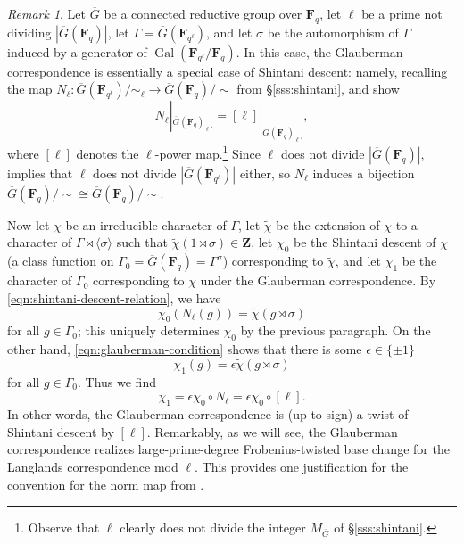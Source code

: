 \documentclass[reqno]{amsart}
\numberwithin{equation}{subsection}
\newcommand{\F}{\mathbf{F}}
\newcommand{\wt}[1]{\widetilde{#1}}
\newcommand{\Z}{\mathbf{Z}}
\newcommand{\Gal}{\operatorname{Gal}}
\newcommand{\ol}[1]{\overline{#1}}
\newcommand{\co}{\colon}
\theoremstyle{remark}
\newtheorem{remark}[thm]{Remark}
\numberwithin{equation}{subsection}
\numberwithin{figure}{subsection}
\begin{document}
\begin{remark}\label{remark:glauberman-shintani}
    Let $\ol G$ be a connected reductive group over $\F_q$, let $\ell$ be a prime not dividing $|\ol G(\F_q)|$, let $\Gamma = \ol G(\F_{q^\ell})$, and let $\sigma$ be the automorphism of $\Gamma$ induced by a generator of $\Gal(\F_{q^\ell}/\F_q)$. In this case, the Glauberman correspondence is essentially a special case of Shintani descent: namely, recalling the map $N_\ell\co \ol G(\F_{q^\ell})/{\sim_\ell} \to \ol G(\F_q)/{\sim}$ from \S\ref{sss:shintani}, \cite[(1.2.6)]{Kaw87} and \cite[Proposition 3.11]{Dig86b} show
    \[
    N_\ell|_{\ol G(\F_q)_{\ell'}} = [\ell]|_{\ol G(\F_q)_{\ell'}},
    \]
    where $[\ell]$ denotes the $\ell$-power map.\footnote{Observe that $\ell$ clearly does not divide the integer $M_{\ol G}$ of \S\ref{sss:shintani}.} Since $\ell$ does not divide $|\ol G(\F_q)|$, \cite[Lemma~2.1]{Cot26a} implies that $\ell$ does not divide $|\ol G(\F_{q^\ell})|$ either, so $N_\ell$ induces a bijection $\ol G(\F_q)/{\sim} \cong \ol G(\F_q)/{\sim}$.

    Now let $\chi$ be an irreducible character of $\Gamma$, let $\wt\chi$ be the extension of $\chi$ to a character of $\Gamma \rtimes\langle\sigma\rangle$ such that $\wt\chi(1\rtimes \sigma) \in \Z$, let $\chi_0$ be the Shintani descent of $\chi$ (a class function on $\Gamma_0 = \ol G(\F_q) = \Gamma^\sigma$) corresponding to $\wt\chi$, and let $\chi_1$ be the character of $\Gamma_0$ corresponding to $\chi$ under the Glauberman correspondence. By \eqref{eqn:shintani-descent-relation}, we have
    \[
    \chi_0(N_\ell(g)) = \wt \chi(g \rtimes \sigma)
    \]
    for all $g \in \Gamma_0$; this uniquely determines $\chi_0$ by the previous paragraph. On the other hand, \eqref{eqn:glauberman-condition} shows that there is some $\epsilon \in \{\pm 1\}$
    \[
    \chi_1(g) = \epsilon\wt\chi(g \rtimes \sigma)
    \]
    for all $g \in \Gamma_0$. Thus we find
    \[
    \chi_1 = \epsilon \chi_0 \circ N_\ell = \epsilon\chi_0 \circ [\ell].
    \]
    In other words, the Glauberman correspondence is (up to sign) a twist of Shintani descent by $[\ell]$. Remarkably, as we will see, the Glauberman correspondence realizes large-prime-degree Frobenius-twisted base change for the Langlands correspondence mod $\ell$. This provides one justification for the convention for the norm map from \cite{Kaw87}.
\end{remark}

\end{document}
